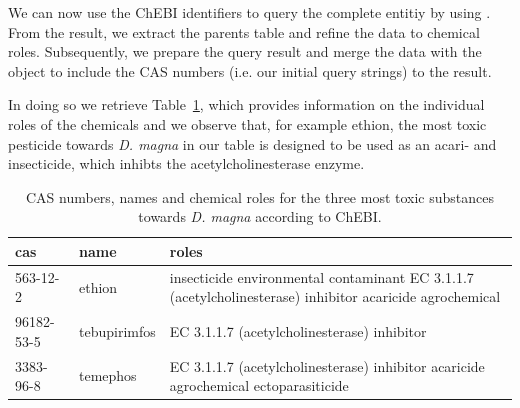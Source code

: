 \documentclass[article]{jss}
\begin{document}
We can now use the ChEBI identifiers to query the complete entitiy by using . From the result, we extract the parents table and refine the data to chemical roles. Subsequently, we prepare the query result and merge the data with the  object to include the CAS numbers (i.e. our initial query strings) to the result.

\begin{CodeChunk}
\begin{CodeInput}
R> comp <- chebi_comp_entity(lite$chebiid) # ChEBI ids
R> comp <- do.call(rbind, lapply(comp, `[[`, "parents")) # extract parents table
R> comp$chebiid <- gsub('\\.[0-9]+', '', rownames(comp))
R> comp <- comp[ comp$type == "has role", ] # refine to chemical roles
R> role <- aggregate(chebiName ~ chebiid,
                     data = comp,
                     FUN = function(x) paste0(x, collapse = ', '))
R> merge(lite[ names(lite) %
         role,
         by = 'chebiid')
\end{CodeInput}
\end{CodeChunk}

In doing so we retrieve Table~\ref{tab:chebi}, which provides information on the individual roles of the chemicals and we observe that, for example ethion, the most toxic pesticide towards \textit{D. magna} in our table is designed to be used as an acari- and insecticide, which inhibts the acetylcholinesterase enzyme.

\begin{table}[t!]
\centering
\begin{tabular}{p{2cm}p{2cm}p{8cm}}
  \hline
  cas & name & roles \\
  \hline
  563-12-2 & ethion & insecticide \newline environmental contaminant \newline EC 3.1.1.7 (acetylcholinesterase) inhibitor \newline acaricide \newline agrochemical \\
  96182-53-5 & tebupirimfos & EC 3.1.1.7 (acetylcholinesterase) inhibitor \\
  3383-96-8 & temephos & EC 3.1.1.7 (acetylcholinesterase) inhibitor \newline acaricide \newline agrochemical \newline ectoparasiticide \\
\hline
\end{tabular}
\caption{CAS numbers, names and chemical roles for the three most toxic substances towards \textit{D. magna} according to ChEBI.}
\label{tab:chebi}
\end{table}
\end{document}
